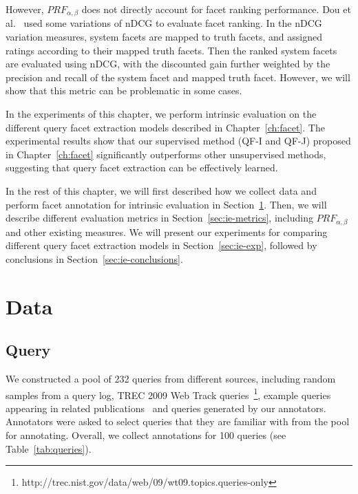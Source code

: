 However, $PRF_{\alpha,\beta}$ does not directly account for facet ranking performance. Dou et al.~\cite{dou2011finding} used some variations of nDCG to evaluate facet ranking. In the nDCG variation measures, system facets are mapped to truth facets, and assigned ratings according to their mapped truth facets. Then the ranked system facets are evaluated using nDCG, with the discounted gain further weighted by the precision and recall of the system facet and mapped truth facet. However, we will show that this metric can be problematic in some cases.

In the experiments of this chapter, we perform intrinsic evaluation on the different query facet extraction models described in Chapter~\ref{ch:facet}. The experimental results show that our supervised method (QF-I and QF-J) proposed in Chapter~\ref{ch:facet} significantly outperforms other unsupervised methods, suggesting that query facet extraction can be effectively learned.

In the rest of this chapter, we will first described how we collect data and perform facet annotation for intrinsic evaluation in Section~\ref{sec:ie-data}. Then, we will describe different evaluation metrics in Section~\ref{sec:ie-metrics}, including $PRF_{\alpha,\beta}$ and other existing measures. We will present our experiments for comparing different query facet extraction models in Section~\ref{sec:ie-exp}, followed by conclusions in Section~\ref{sec:ie-conclusions}. 


\section{Data} \label{sec:ie-data}
\subsection{Query}
We constructed a pool of 232 queries from different sources, including random samples from a query log, TREC 2009 Web Track queries~\footnote{http://trec.nist.gov/data/web/09/wt09.topics.queries-only}, example queries appearing in related publications~\cite{xue2011topic,wang2009mining} and queries generated by our annotators.
Annotators were asked to select queries that they are familiar with from the pool for annotating.
Overall, we collect annotations for 100 queries (see Table~\ref{tab:queries}).

